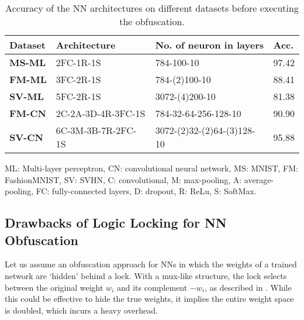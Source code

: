 \documentclass[10pt, twocolumn, conference]{IEEEtran}
\begin{document}
\begin{table}[h]
\begin{threeparttable}
\caption{Accuracy of the NN architectures on different datasets  before executing the obfuscation\textsuperscript{\textbf{\textcolor{gray}{}}}.} \vspace{-10pt}
\label{tab:table_1}
\begin{tabular}{|p{}|p{2.65cm}|p{3.2cm}|p{0.45cm}|}
\hline
\textbf{Dataset}   & \textbf{Architecture} & \textbf{No. of neuron in layers} & \textbf{Acc.} \\ \hline
\textbf{MS-ML} & 2FC-1R-1S & 784-100-10 & 97.42 \\ \hline
\textbf{FM-ML} & 3FC-2R-1S & 784-(2)100-10 & 88.41 \\ \hline
\textbf{SV-ML} & 5FC-2R-1S & 3072-(4)200-10 & 81.38 \\ \hline
\textbf{FM-CN} & 2C-2A-3D-4R-3FC-1S & 784-32-64-256-128-10 & 90.90 \\ \hline
\textbf{SV-CN} & 6C-3M-3B-7R-2FC-1S  & 3072-(2)32-(2)64-(3)128-10 & 95.88 \\ \hline
\end{tabular}
\begin{tablenotes}
      \small
      \item [\textbf{\textcolor{gray}{\ding{68}}}] ML: Multi-layer perceptron, CN: convolutional neural network, MS: MNIST, FM: FashionMNIST, SV: SVHN, C: convolutional, M: max-pooling, A: average-pooling, FC: fully-connected layers, D: dropout, R: ReLu, S: SoftMax.
    \end{tablenotes}
  \end{threeparttable}
\end{table}

\subsection{Drawbacks of Logic Locking for NN Obfuscation} \label{drawbacks}

Let us assume an obfuscation approach for NNs in which the weights of a trained network are `hidden' behind a lock. With a mux-like structure, the lock selects between the original weight $w_i$ and its complement $-w_i$, as described in \cite{rfHwAssDate}. While this could be effective to hide the true weights, it implies the entire weight space is doubled, which incurs a heavy overhead. 
\end{document}
